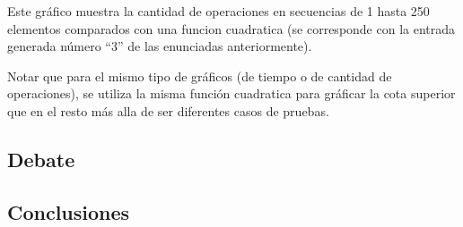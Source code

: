 Este gráfico muestra la cantidad de operaciones en secuencias de 1 hasta 250 elementos comparados con una funcion cuadratica (se corresponde con la entrada generada número ``3'' de las enunciadas anteriormente).

Notar que para el mismo tipo de gráficos (de tiempo o de cantidad de operaciones), se utiliza la misma función cuadratica para gráficar la cota superior que en el resto más alla de ser diferentes casos de pruebas. 



\subsection{Debate}
\subsection{Conclusiones}

